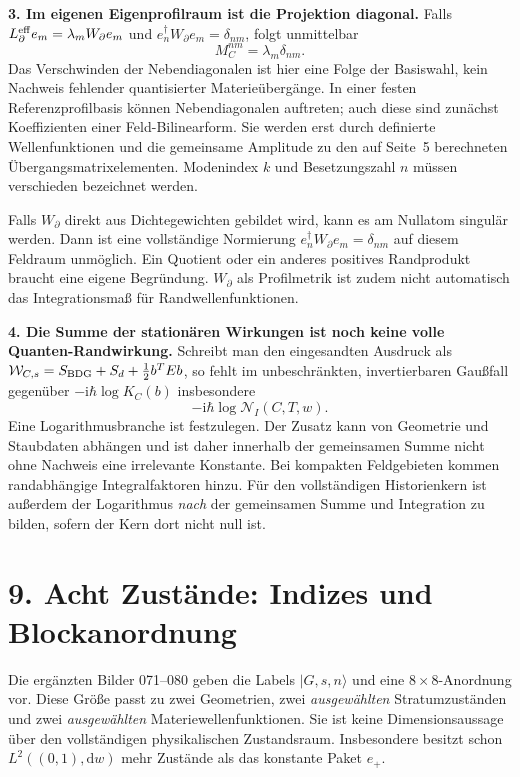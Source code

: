 \documentclass[10pt,a4paper]{article}
\newcommand{\dd}{\mathrm d}
\newcommand{\ii}{\mathrm i}
\newcommand{\sect}[1]{\section*{\color{navy}#1}}
\begin{document}
\textbf{3. Im eigenen Eigenprofilraum ist die Projektion diagonal.}
Falls $L^{\rm eff}_\partial e_m=\lambda_mW_\partial e_m$ und
$e_n^\dagger W_\partial e_m=\delta_{nm}$, folgt unmittelbar
\[
\boxed{M_C^{nm}=\lambda_m\delta_{nm}.}
\]
Das Verschwinden der Nebendiagonalen ist hier eine Folge der Basiswahl,
kein Nachweis fehlender quantisierter Materieübergänge. In einer festen
Referenzprofilbasis können Nebendiagonalen auftreten; auch diese sind
zunächst Koeffizienten einer Feld-Bilinearform. Sie werden erst durch
definierte Wellenfunktionen und die gemeinsame Amplitude zu den auf
Seite~5 berechneten Übergangsmatrixelementen. Modenindex $k$ und
Besetzungszahl $n$ müssen verschieden bezeichnet werden.

Falls $W_\partial$ direkt aus Dichtegewichten gebildet wird, kann es am
Nullatom singulär werden. Dann ist eine vollständige Normierung
$e_n^\dagger W_\partial e_m=\delta_{nm}$ auf diesem Feldraum unmöglich.
Ein Quotient oder ein anderes positives Randprodukt braucht eine eigene
Begründung. $W_\partial$ als Profilmetrik ist zudem nicht automatisch das
Integrationsmaß für Randwellenfunktionen.

\textbf{4. Die Summe der stationären Wirkungen ist noch keine volle
Quanten-Randwirkung.}
Schreibt man den eingesandten Ausdruck als
$\mathcal W_{C,s}=S_{\rm BDG}+S_d+\frac12b^TEb$, so fehlt im unbeschränkten,
invertierbaren Gaußfall gegenüber $-\ii\hbar\log K_C(b)$ insbesondere
\[
-\ii\hbar\log\mathcal N_I(C,T,w).
\]
Eine Logarithmusbranche ist festzulegen. Der Zusatz kann von Geometrie
und Staubdaten abhängen und ist daher innerhalb der gemeinsamen Summe
nicht ohne Nachweis eine irrelevante Konstante. Bei kompakten Feldgebieten
kommen randabhängige Integralfaktoren hinzu. Für den vollständigen
Historienkern ist außerdem der Logarithmus \emph{nach} der gemeinsamen
Summe und Integration zu bilden, sofern der Kern dort nicht null ist.
\newpage
\sect{9. Acht Zustände: Indizes und Blockanordnung}
Die ergänzten Bilder 071--080 geben die Labels $|G,s,n\rangle$ und eine
$8\times8$-Anordnung vor. Diese Größe passt zu zwei Geometrien, zwei
\emph{ausgewählten} Stratumzuständen und zwei \emph{ausgewählten}
Materiewellenfunktionen. Sie ist keine Dimensionsaussage über den
vollständigen physikalischen Zustandsraum. Insbesondere besitzt schon
$L^2((0,1),\dd w)$ mehr Zustände als das konstante Paket $e_+$.
\end{document}
